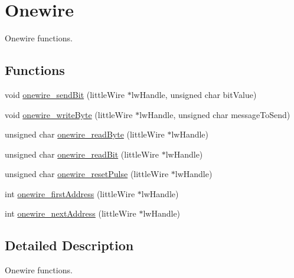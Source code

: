 \hypertarget{group__Onewire}{\section{Onewire}
\label{group__Onewire}
}


Onewire functions.  


\subsection*{Functions}
\begin{DoxyCompactItemize}
\item 
void \hyperlink{group__Onewire_gad9a7968da3c0e6a22c93a2f861f56308}{onewire\-\_\-send\-Bit} (little\-Wire $\ast$lw\-Handle, unsigned char bit\-Value)
\item 
void \hyperlink{group__Onewire_ga97530a60cae61320e5a9cd87788b97ef}{onewire\-\_\-write\-Byte} (little\-Wire $\ast$lw\-Handle, unsigned char message\-To\-Send)
\item 
unsigned char \hyperlink{group__Onewire_ga8056dd5d6ee015abfdf10d0b1533c2c5}{onewire\-\_\-read\-Byte} (little\-Wire $\ast$lw\-Handle)
\item 
unsigned char \hyperlink{group__Onewire_ga7d6330de45dfa5527a48813a7d7ab4f3}{onewire\-\_\-read\-Bit} (little\-Wire $\ast$lw\-Handle)
\item 
unsigned char \hyperlink{group__Onewire_ga1da45189d08a3c6e030a53c0f936cb0a}{onewire\-\_\-reset\-Pulse} (little\-Wire $\ast$lw\-Handle)
\item 
int \hyperlink{group__Onewire_ga802601429c0c4b2593bdf5f123c4894d}{onewire\-\_\-first\-Address} (little\-Wire $\ast$lw\-Handle)
\item 
int \hyperlink{group__Onewire_ga0fed6927e5e160f57751bc6e66e7b4bf}{onewire\-\_\-next\-Address} (little\-Wire $\ast$lw\-Handle)
\end{DoxyCompactItemize}


\subsection{Detailed Description}
Onewire functions. 

